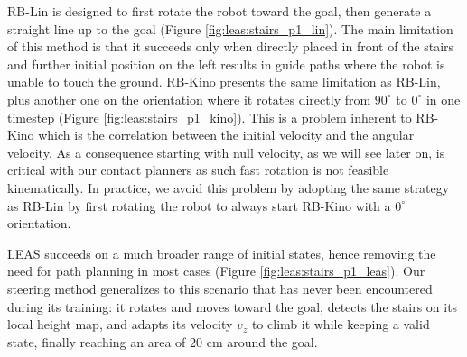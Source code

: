 RB-Lin is designed to first rotate the robot toward the goal, then generate a straight line up to the goal (Figure \ref{fig:leas:stairs_p1_lin}). The main limitation of this method is that it succeeds only when directly placed in front of the stairs and further initial position on the left results in guide paths where the robot is unable to touch the ground.
RB-Kino presents the same limitation as RB-Lin, plus another one on the orientation where it rotates directly from $90^{\circ}$ to $0^{\circ}$ in one timestep (Figure \ref{fig:leas:stairs_p1_kino}). This is a problem inherent to RB-Kino which is the correlation between the initial velocity and the angular velocity. As a consequence starting with null velocity, as we will see later on, is critical with our contact planners as such fast rotation is not feasible kinematically. 
In practice, we avoid this problem by adopting the same strategy as RB-Lin by first rotating the robot to always start RB-Kino with a $0^{\circ}$ orientation.

LEAS  succeeds on a much broader range of initial states, hence removing the need for path planning in most cases (Figure \ref{fig:leas:stairs_p1_leas}). Our steering method generalizes to this scenario that has never been encountered during its training: it rotates and moves toward the goal, detects the stairs on its local height map, and adapts its velocity $v_z$ to climb it while keeping a valid state, finally reaching an area of $20$ cm around the goal.

\hfill \break
\hfill \break

